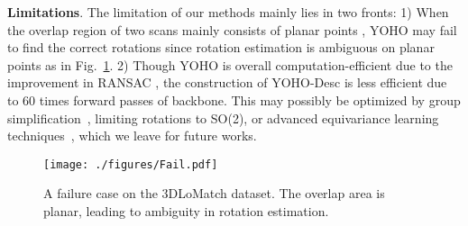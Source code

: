 \begin{table}[]\footnotesize
\renewcommand{\arraystretch}{1.02}\begin{center}
\end{center}
\caption{The time consumption for the registration on the 3DMatch dataset and the 3DLoMatch dataset. We provide the time  used in the feature extraction of one point cloud fragment and the time  in aligning a point cloud pair, and the total time  on the registration of the 3DMatch and the 3DLoMatch dataset.}
\label{tab:time_new}
\vspace{-25pt}
\end{table}


\textbf{Limitations}. 
The limitation of our methods mainly lies in two fronts: 1) When the overlap region of two scans mainly consists of planar points
, YOHO may fail to find the correct rotations since rotation estimation is ambiguous on planar points as in Fig.~\ref{fig:fail}.
2) Though YOHO is overall computation-efficient due to 
the improvement in RANSAC 
, the construction of YOHO-Desc is less efficient due to 60 times forward passes of backbone. 
This may possibly be optimized by group simplification~\cite{EMVN}, limiting rotations to SO(2), or advanced equivariance learning techniques~\cite{VN,tensorfield}, which we leave for future works.



\begin{figure}
\begin{center}
\texttt{[image: ./figures/Fail.pdf]}
\vspace{-10pt}
\end{center}
   \caption{A failure case on the 3DLoMatch dataset. The overlap area is planar, leading to ambiguity in rotation estimation.}
\label{fig:fail}
\vspace{-10pt}
\end{figure}

